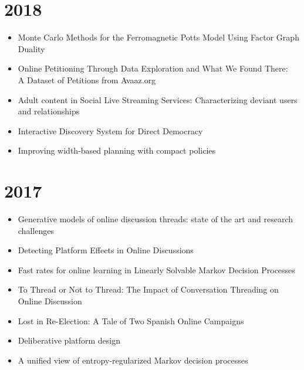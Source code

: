 \documentclass{article}
\begin{document}
\section*{2018}
\begin{itemize}
\item Monte Carlo Methods for the Ferromagnetic Potts Model Using Factor Graph Duality~\cite{dual_potts}
\item Online Petitioning Through Data Exploration and What We Found There:\\ A Dataset of Petitions from Avaaz.org~\cite{icwsm2018}
\item Adult content in Social Live Streaming Services: Characterizing deviant users and relationships~\cite{lykousas2018adult}
\item Interactive Discovery System for Direct Democracy~\cite{aragon2018interactive}
\item Improving width-based planning with compact policies~\cite{junyentPAL18}
\end{itemize}

\section*{2017}
\begin{itemize}
\item Generative models of online discussion threads: state of the art and research challenges~\cite{AragonJISA2017}
\item Detecting Platform Effects in Online Discussions~\cite{POI3:POI3158}
\item Fast rates for online learning in Linearly Solvable Markov Decision Processes~\cite{neu17a}
\item To Thread or Not to Thread: The Impact of Conversation Threading on Online Discussion~\cite{icwsm2017}
\item Lost in Re-Election: A Tale of Two Spanish Online Campaigns~\cite{Gallego2017}
\item Deliberative platform design~\cite{AragonDecidim2017}
\item A unified view of entropy-regularized Markov decision processes~\cite{neuDRL17}
\end{itemize}
\end{document}
